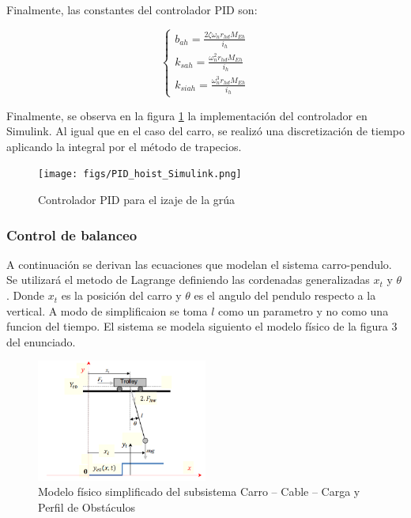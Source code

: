 \documentclass{article}
\begin{document}
            Finalmente, las constantes del controlador PID son:
            
            \begin{equation}
                \begin{cases}
                    b_{ah} = \frac{2 \zeta \omega_n r_{hd} M_{Eh}}{i_h} \\
                    k_{sah} = \frac{\omega_n^2 r_{hd} M_{Eh}}{i_h} \\
                    k_{siah} = \frac{\omega_n^3 r_{hd} M_{Eh}}{i_h}
                \end{cases}
            \end{equation}

            Finalmente, se observa en la figura \ref{fig:pid_hoist_simulink} la implementación del controlador en Simulink. Al igual que en el caso del carro, se realizó una discretización de tiempo aplicando la integral por el método de trapecios.

            \begin{figure}[H]
                \centering
                \texttt{[image: figs/PID\_hoist\_Simulink.png]}
                \caption{Controlador PID para el izaje de la grúa}
                \label{fig:pid_hoist_simulink}
            \end{figure}
        


        \subsubsection{Control de balanceo}

            A continuación se derivan las ecuaciones que modelan el sistema carro-pendulo. Se utilizará el metodo de Lagrange definiendo las cordenadas generalizadas 
            \(x_t\) y \(\theta\) . Donde \(x_t\) es la posición del carro y \(\theta\) es el angulo del pendulo respecto a la vertical. 
            A modo de simplificaion se toma \(l\) como un parametro y no como una funcion del tiempo.
            El sistema se modela siguiento el modelo físico de la figura 3 del enunciado.
            \begin{figure}[H]
                \centering
                \includegraphics[width=0.5\textwidth]{figs/figure3_enunciado.png}
                \caption{Modelo físico simplificado del subsistema Carro – Cable – Carga y Perfil de Obstáculos}
                \label{fig:pendulo}
            \end{figure}
            
\end{document}
